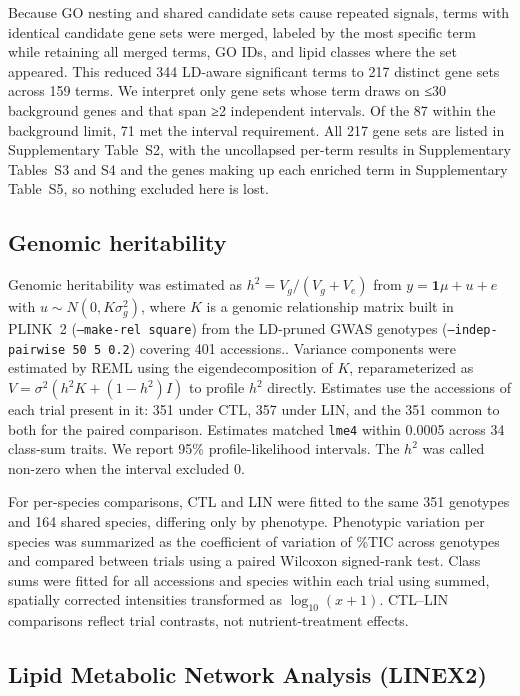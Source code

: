 \documentclass[9pt,twocolumn,twoside]{rilabRxiv}
\begin{document}
Because GO nesting and shared candidate sets cause repeated signals, terms with identical candidate gene sets were merged, labeled by the most specific term while retaining all merged terms, GO IDs, and lipid classes where the set appeared. This reduced 344 LD-aware significant terms to 217 distinct gene sets across 159 terms. We interpret only gene sets whose term draws on ≤30 background genes and that span ≥2 independent intervals. Of the 87 within the background limit, 71 met the interval requirement. All 217 gene sets are listed in Supplementary Table~S2, with the uncollapsed per-term results in Supplementary Tables~S3 and S4 and the genes making up each enriched term in Supplementary Table~S5, so nothing excluded here is lost.

\subsection*{Genomic heritability}
Genomic heritability was estimated as $h^2 = V_g/(V_g+V_e)$ from $y = \mathbf{1}\mu + u + e$ with $u \sim N(0, K\sigma_g^2)$, where $K$ is a genomic relationship matrix built in PLINK~2 (\texttt{--make-rel square}) from the LD-pruned GWAS genotypes (\texttt{--indep-pairwise 50 5 0.2}) covering 401 accessions.. Variance components were estimated by REML using the eigendecomposition of $K$, reparameterized as $V=\sigma^2(h^2K+(1-h^2)I)$ to profile $h^2$ directly. Estimates use the accessions of each trial present in it: 351 under CTL, 357 under LIN, and the 351 common to both for the paired comparison. Estimates matched \texttt{lme4} \citep{Bates2015lme4} within 0.0005 across 34 class-sum traits. We report 95\% profile-likelihood intervals. The $h^2$ was called non-zero when the interval excluded 0. 

For per-species comparisons, CTL and LIN were fitted to the same 351 genotypes and 164 shared species, differing only by phenotype. Phenotypic variation per species was summarized as the coefficient of variation of \%TIC across genotypes and compared between trials using a paired Wilcoxon signed-rank test. Class sums were fitted for all accessions and species within each trial using summed, spatially corrected intensities transformed as $\log_{10}(x+1)$. CTL--LIN comparisons reflect trial contrasts, not nutrient-treatment effects.

\subsection*{Lipid Metabolic Network Analysis (LINEX2)}
\end{document}
